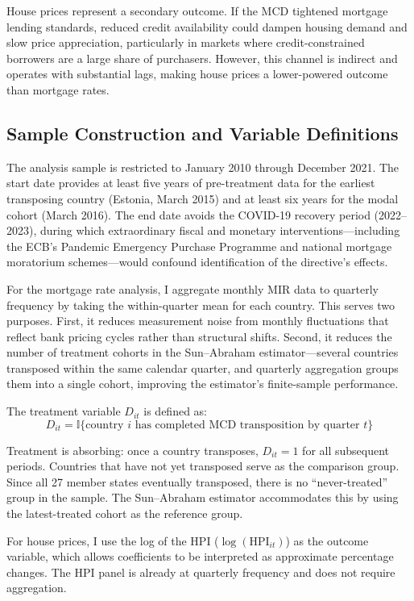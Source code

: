 \documentclass[12pt]{article}
\newcommand{\ind}{\mathbb{I}}
\begin{document}
House prices represent a secondary outcome. If the MCD tightened mortgage lending standards, reduced credit availability could dampen housing demand and slow price appreciation, particularly in markets where credit-constrained borrowers are a large share of purchasers. However, this channel is indirect and operates with substantial lags, making house prices a lower-powered outcome than mortgage rates.

\subsection{Sample Construction and Variable Definitions}

The analysis sample is restricted to January 2010 through December 2021. The start date provides at least five years of pre-treatment data for the earliest transposing country (Estonia, March 2015) and at least six years for the modal cohort (March 2016). The end date avoids the COVID-19 recovery period (2022--2023), during which extraordinary fiscal and monetary interventions---including the ECB's Pandemic Emergency Purchase Programme and national mortgage moratorium schemes---would confound identification of the directive's effects.

For the mortgage rate analysis, I aggregate monthly MIR data to quarterly frequency by taking the within-quarter mean for each country. This serves two purposes. First, it reduces measurement noise from monthly fluctuations that reflect bank pricing cycles rather than structural shifts. Second, it reduces the number of treatment cohorts in the Sun--Abraham estimator---several countries transposed within the same calendar quarter, and quarterly aggregation groups them into a single cohort, improving the estimator's finite-sample performance.

The treatment variable $D_{it}$ is defined as:
\begin{equation}
D_{it} = \ind\{\text{country } i \text{ has completed MCD transposition by quarter } t\}
\end{equation}

Treatment is absorbing: once a country transposes, $D_{it} = 1$ for all subsequent periods. Countries that have not yet transposed serve as the comparison group. Since all 27 member states eventually transposed, there is no ``never-treated'' group in the sample. The Sun--Abraham estimator accommodates this by using the latest-treated cohort as the reference group.

For house prices, I use the log of the HPI ($\log(\text{HPI}_{it})$) as the outcome variable, which allows coefficients to be interpreted as approximate percentage changes. The HPI panel is already at quarterly frequency and does not require aggregation.
\end{document}
